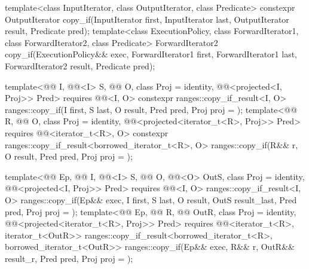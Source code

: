 %
\begin{itemdecl}
template<class InputIterator, class OutputIterator, class Predicate>
  constexpr OutputIterator copy_if(InputIterator first, InputIterator last,
                                   OutputIterator result, Predicate pred);
template<class ExecutionPolicy, class ForwardIterator1, class ForwardIterator2,
         class Predicate>
  ForwardIterator2 copy_if(ExecutionPolicy&& exec,
                           ForwardIterator1 first, ForwardIterator1 last,
                           ForwardIterator2 result, Predicate pred);

template<@@ I, @@<I> S, @@ O, class Proj = identity,
         @@<projected<I, Proj>> Pred>
  requires @@<I, O>
  constexpr ranges::copy_if_result<I, O>
    ranges::copy_if(I first, S last, O result, Pred pred, Proj proj = {});
template<@@ R, @@ O, class Proj = identity,
         @@<projected<iterator_t<R>, Proj>> Pred>
  requires @@<iterator_t<R>, O>
  constexpr ranges::copy_if_result<borrowed_iterator_t<R>, O>
    ranges::copy_if(R&& r, O result, Pred pred, Proj proj = {});

template<@@ Ep, @@ I, @@<I> S,
          @@ O, @@<O> OutS,
          class Proj = identity, @@<projected<I, Proj>> Pred>
  requires @@<I, O>
  ranges::copy_if_result<I, O>
    ranges::copy_if(Ep&& exec, I first, S last, O result, OutS result_last,
                    Pred pred, Proj proj = {});
template<@@ Ep, @@ R, @@ OutR,
          class Proj = identity,
          @@<projected<iterator_t<R>, Proj>> Pred>
  requires @@<iterator_t<R>, iterator_t<OutR>>
  ranges::copy_if_result<borrowed_iterator_t<R>, borrowed_iterator_t<OutR>>
    ranges::copy_if(Ep&& exec, R&& r, OutR&& result_r, Pred pred, Proj proj = {});
\end{itemdecl}

